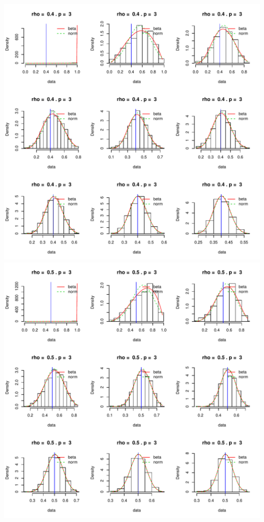 \documentclass[]{article}
\begin{document}
\includegraphics{2016_w09_files/figure-latex/unnamed-chunk-15-5.pdf}
\includegraphics{2016_w09_files/figure-latex/unnamed-chunk-15-6.pdf}
\end{document}

